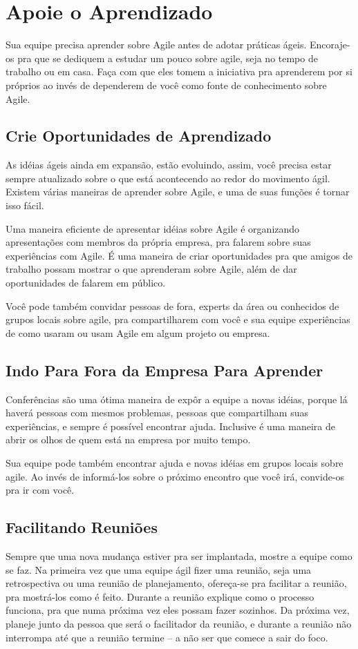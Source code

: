 \documentclass[a4paper, 10pt, font=plain]{abnt}
\begin{document}
\section{Apoie o Aprendizado}
Sua equipe precisa aprender sobre Agile antes de adotar práticas ágeis. Encoraje-os pra que se dediquem a estudar um pouco sobre agile, seja no tempo de trabalho ou em casa. Faça com que eles tomem a iniciativa pra aprenderem por si próprios ao invés de dependerem de você como fonte de conhecimento sobre Agile.


\subsection{Crie Oportunidades de Aprendizado}
As idéias ágeis ainda em expansão, estão evoluindo, assim, você precisa estar sempre atualizado sobre o que está acontecendo ao redor do movimento ágil. Existem várias maneiras de aprender sobre Agile, e uma de suas funções é tornar isso fácil.

Uma maneira eficiente de apresentar idéias sobre Agile é organizando apresentações com membros da própria empresa, pra falarem sobre suas experiências com Agile. É uma maneira de criar oportunidades pra que amigos de trabalho possam mostrar o que aprenderam sobre Agile, além de dar oportunidades de falarem em público.

Você pode também convidar pessoas de fora, experts da área ou conhecidos de grupos locais sobre agile, pra compartilharem com você e sua equipe experiências de como usaram ou usam Agile em algum projeto ou empresa.


\subsection{Indo Para Fora da Empresa Para Aprender}
Conferências são uma ótima maneira de expôr a equipe a novas idéias, porque lá haverá pessoas com mesmos problemas, pessoas que compartilham suas experiências, e sempre é possível encontrar ajuda. Inclusive é uma maneira de abrir os olhos de quem está na empresa por muito tempo.

Sua equipe pode também encontrar ajuda e novas idéias em grupos locais sobre agile. Ao invés de informá-los sobre o próximo encontro que você irá, convide-os pra ir com você.


\subsection{Facilitando Reuniões}
Sempre que uma nova mudança estiver pra ser implantada, mostre a equipe como se faz. Na primeira vez que uma equipe ágil fizer uma reunião, seja uma retrospectiva ou uma reunião de planejamento, ofereça-se pra facilitar a reunião, pra mostrá-los como é feito. Durante a reunião explique como o processo funciona, pra que numa próxima vez eles possam fazer sozinhos. Da próxima vez, planeje junto da pessoa que será o facilitador da reunião, e durante a reunião não interrompa até que a reunião termine -- a não ser que comece a sair do foco.
\end{document}
